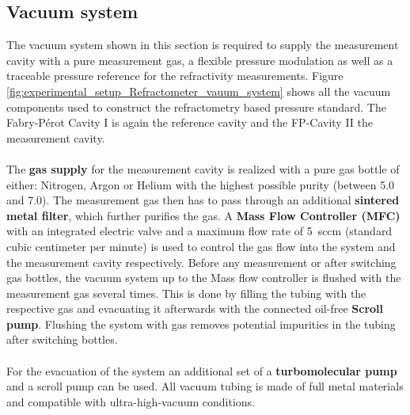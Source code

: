 \subsection{Vacuum system}
The vacuum system shown in this section is required to supply the measurement cavity with a pure measurement gas, a flexible pressure modulation as well as a traceable pressure reference for the refractivity measurements. 
Figure \ref{fig:experimental_setup_Refractometer_vauum_system} shows all the vacuum components used to construct the refractometry based pressure standard. The Fabry-Pérot Cavity I is again the reference cavity and the FP-Cavity II the measurement cavity. \\\\
\noindent
The \textbf{gas supply} for the measurement cavity is realized with a pure gas bottle of either: Nitrogen, Argon or Helium with the highest possible purity (between 5.0 and 7.0). The measurement gas then has to pass through an additional \textbf{sintered metal filter}, which further purifies the gas. A \textbf{Mass Flow Controller (MFC)} with an integrated electric valve and a maximum flow rate of \mbox{5 sccm} (standard cubic centimeter per minute) is used to control the gas flow into the system and the measurement cavity respectively. Before any measurement or after switching gas bottles, the vacuum system up to the Mass flow controller is flushed with the measurement gas several times. This is done by filling the tubing with the respective gas and evacuating it afterwards with the connected oil-free \textbf{Scroll pump}. Flushing the system with gas removes potential impurities in the tubing after switching bottles. \\\\
\noindent
For the evacuation of the system an additional set of a \textbf{turbomolecular pump} and a scroll pump can be used. All vacuum tubing is made of full metal materials and compatible with ultra-high-vacuum conditions.  \\\\

